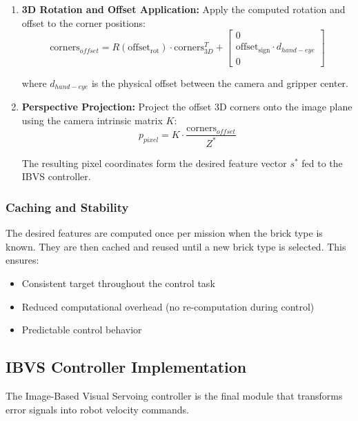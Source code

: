 \begin{enumerate}
    \item \textbf{3D Rotation and Offset Application:} Apply the computed rotation and offset to the corner positions:
    \begin{equation}
        \text{corners}_{offset} = R(\text{offset}_{\text{rot}}) \cdot \text{corners}_{3D}^T + \begin{bmatrix} 0 \\ \text{offset}_{\text{sign}} \cdot d_{hand-eye} \\ 0 \end{bmatrix}
    \end{equation}
    
    where $d_{hand-eye}$ is the physical offset between the camera and gripper center.
    
    \item \textbf{Perspective Projection:} Project the offset 3D corners onto the image plane using the camera intrinsic matrix $K$:
    \begin{equation}
        p_{pixel} = K \cdot \frac{\text{corners}_{offset}}{Z^*}
    \end{equation}
    
    The resulting pixel coordinates form the desired feature vector $s^*$ fed to the IBVS controller.
\end{enumerate}

\subsubsection{Caching and Stability}
The desired features are computed once per mission when the brick type is known. They are then cached and reused until a new brick type is selected. This ensures:
\begin{itemize}
    \item Consistent target throughout the control task
    \item Reduced computational overhead (no re-computation during control)
    \item Predictable control behavior
\end{itemize}

\subsection{IBVS Controller Implementation}

The Image-Based Visual Servoing controller is the final module that transforms error signals into robot velocity commands.

